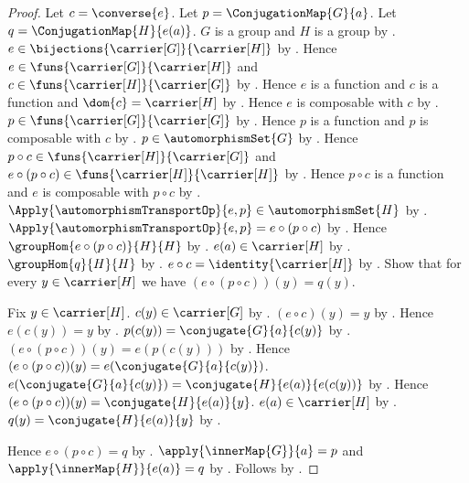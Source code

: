 \begin{proof}
    Let $c=\converse{e}$.
    Let $p=\ConjugationMap{G}{a}$.
    Let $q=\ConjugationMap{H}{e(a)}$.
    $G$ is a group and $H$ is a group by
        .
    $e\in\bijections{\carrier[G]}{\carrier[H]}$ by
        .
    Hence $e\in\funs{\carrier[G]}{\carrier[H]}$ and
        $c\in\funs{\carrier[H]}{\carrier[G]}$ by
        .
    Hence $e$ is a function and $c$ is a function and
        $\dom{c}=\carrier[H]$ by
        .
    Hence $e$ is composable with $c$ by
        .
    $p\in\funs{\carrier[G]}{\carrier[G]}$ by
        .
    Hence $p$ is a function and $p$ is composable with $c$ by
        .
    $p\in\automorphismSet{G}$ by
        .
    Hence $p\circ c\in\funs{\carrier[H]}{\carrier[G]}$ and
        $e\circ(p\circ c)\in
            \funs{\carrier[H]}{\carrier[H]}$ by
        .
    Hence $p\circ c$ is a function and
        $e$ is composable with $p\circ c$ by
        .
    $\Apply{\automorphismTransportOp}{e,p}
        \in\automorphismSet{H}$ by
        .
    $\Apply{\automorphismTransportOp}{e,p}
        =e\circ(p\circ c)$ by
        .
    Hence $\groupHom{e\circ(p\circ c)}{H}{H}$ by
        .
    $e(a)\in\carrier[H]$ by
        .
    $\groupHom{q}{H}{H}$ by
        .
    $e\circ c=\identity{\carrier[H]}$ by
        .
    Show that for every $y\in\carrier[H]$ we have
        $(e\circ(p\circ c))(y)=q(y)$.
    \begin{subproof}
        Fix $y\in\carrier[H]$.
        $c(y)\in\carrier[G]$ by .
        $(e\circ c)(y)=y$ by
            .
        Hence $e(c(y))=y$ by .
        $p(c(y))=\conjugate{G}{a}{c(y)}$ by
            .
        $(e\circ(p\circ c))(y)=e(p(c(y)))$ by
            .
        Hence
            $(e\circ(p\circ c))(y)=
                e(\conjugate{G}{a}{c(y)})$.
        $e(\conjugate{G}{a}{c(y)})=
            \conjugate{H}{e(a)}{e(c(y))}$ by
            .
        Hence $(e\circ(p\circ c))(y)=
            \conjugate{H}{e(a)}{y}$.
        $e(a)\in\carrier[H]$ by
            .
        $q(y)=\conjugate{H}{e(a)}{y}$ by
            .
    \end{subproof}
    Hence $e\circ(p\circ c)=q$ by
        .
    $\apply{\innerMap{G}}{a}=p$ and
        $\apply{\innerMap{H}}{e(a)}=q$ by
        .
    Follows by .
\end{proof}

